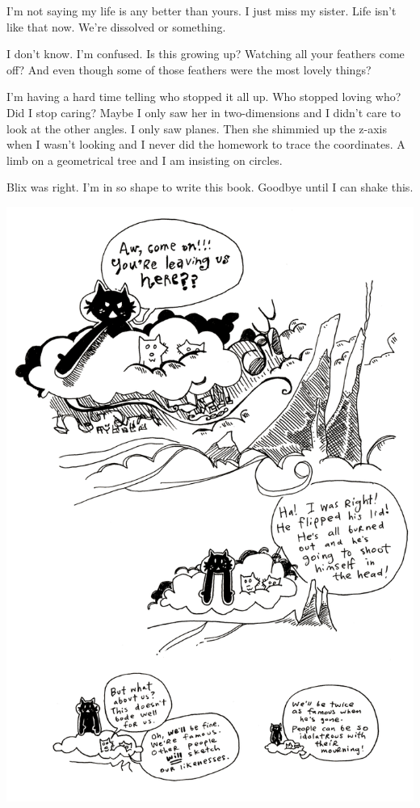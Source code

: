 \documentclass[10pt,twoside]{report}
\begin{document}
I'm not saying my life is any better than yours.  I just miss my
sister.  Life isn't like that now. We're dissolved or something.

I don't know.  I'm confused.  Is this growing up?  Watching all your
feathers come off?  And even though some of those feathers were the
most lovely things?

I'm having a hard time telling who stopped it all up.  Who stopped
loving who?  Did I stop caring?  Maybe I only saw her in
two-dimensions and I didn't care to look at the other angles.  I only
saw planes.  Then she shimmied up the z-axis when I wasn't looking and
I never did the homework to trace the coordinates.  A limb on a
geometrical tree and I am insisting on circles.

Blix was right.  I'm in so shape to write this book.  Goodbye until I
can shake this.

	\includegraphics[width=1.0\textwidth]{cache/79.png}
\end{document}
